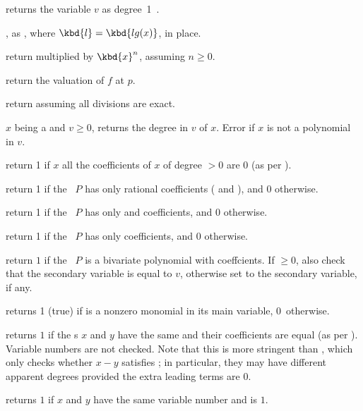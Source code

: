  returns the variable $v$ as degree~1~.

, as , where
$\kbd{l} = \kbd{lg(x)}$, in place.

 return 
multiplied by $\kbd{x}^n$, assuming $n\geq 0$.

 return the valuation of $f$ at $p$.

 return  assuming all divisions
are exact.



 $x$ being a  and $v \geq 0$,
returns the degree in $v$ of $x$. Error if $x$ is not a polynomial in $v$.

 return 1 if $x$ all the coefficients of
$x$ of degree $> 0$ are $0$ (as per ).

 return 1 if the ~$P$ has only
rational coefficients ( and ), and 0 otherwise.

 return 1 if the ~$P$ has only
 and  coefficients, and 0 otherwise.

 return 1 if the ~$P$ has only
 coefficients, and 0 otherwise.

 return $1$ if the ~$P$ is
a bivariate polynomial with  coeffcients. If $\geq 0$, also
check that the secondary variable is equal to $v$, otherwise set  to
the secondary variable, if any.

 returns 1 (true) if  is a nonzero
monomial in its main variable, 0~otherwise.

 returns $1$ if the s $x$ and $y$
have the same  and their coefficients are equal (as per
). Variable numbers are not checked. Note that this is more
stringent than , which only checks whether $x - y$ satisfies
; in particular, they may have different apparent degrees provided
the extra leading terms are $0$.

 returns $1$ if $x$ and $y$
have the same variable number and  is $1$.

